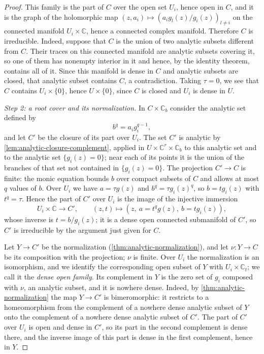 \begin{proof}
This family is the part of $C$ over the open set $U_i$, hence open in $C$, and it is the graph of the holomorphic map $(z,a_i)\mapsto(a_ig_l(z)/g_i(z))_{l\neq i}$ on the connected manifold $U_i\times\mathbb C$, hence a connected complex manifold. Therefore $C$ is irreducible. Indeed, suppose that $C$ is the union of two analytic subsets different from $C$. Their traces on this connected manifold are analytic subsets covering it, so one of them has nonempty interior in it and hence, by the identity theorem, contains all of it. Since this manifold is dense in $C$ and analytic subsets are closed, that analytic subset contains $C$, a contradiction. Taking $\tau=0$, we see that $C$ contains $U_i\times\{0\}$, hence $U\times\{0\}$, since $C$ is closed and $U_i$ is dense in $U$.

\emph{Step 2: a root cover and its normalization.} In $C\times\mathbb C_b$ consider the analytic set defined by
\[
 b^q=a_ig_i^{q-1},
\]
and let $C'$ be the closure of its part over $U_i$. The set $C'$ is analytic by \cref{lem:analytic-closure-complement}, applied in $U\times\mathbb C^r\times\mathbb C_b$ to this analytic set and to the analytic set $\{g_i(z)=0\}$; near each of its points it is the union of the branches of that set not contained in $\{g_i(z)=0\}$. The projection $C'\to C$ is finite: the monic equation bounds $b$ over compact subsets of $C$ and allows at most $q$ values of $b$. Over $U_i$ we have $a=\tau g(z)$ and $b^q=\tau g_i(z)^q$, so $b=tg_i(z)$ with $t^q=\tau$. Hence the part of $C'$ over $U_i$ is the image of the injective immersion
\[
 U_i\times\mathbb C\to C',\qquad (z,t)\longmapsto
       (z,\ a=t^qg(z),\ b=tg_i(z)),
\]
whose inverse is $t=b/g_i(z)$; it is a dense open connected submanifold of $C'$, so $C'$ is irreducible by the argument just given for $C$.

Let $Y\to C'$ be the normalization (\cref{thm:analytic-normalization}), and let $\nu\colon Y\to C$ be its composition with the projection; $\nu$ is finite. Over $U_i$ the normalization is an isomorphism, and we identify the corresponding open subset of $Y$ with $U_i\times\mathbb C_t$; we call it the \emph{dense open family}. Its complement in $Y$ is the zero set of $g_i$ composed with $\nu$, an analytic subset, and it is nowhere dense. Indeed, by \cref{thm:analytic-normalization} the map $Y\to C'$ is bimeromorphic: it restricts to a homeomorphism from the complement of a nowhere dense analytic subset of $Y$ onto the complement of a nowhere dense analytic subset of $C'$. The part of $C'$ over $U_i$ is open and dense in $C'$, so its part in the second complement is dense there, and the inverse image of this part is dense in the first complement, hence in $Y$.


\end{proof}
